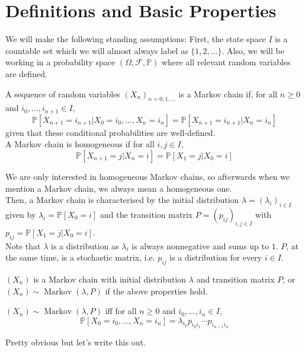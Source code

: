 \section{Definitions and Basic Properties}
We will make the following standing assumptions:
First, the state space $I$ is a countable set which we will almost always label as $\{1,2,\ldots\}$.
Also, we will be working in a probability space $(\Omega,\mathscr F,\mathbb P)$ where all relevant random variables are defined.
\begin{definition}
    A sequence of random variables $(X_n)_{n=0,1,\ldots}$ is a Markov chain if, for all $n\ge 0$ and $i_0,\ldots,i_{n+1}\in I$,
    $$\mathbb P[X_{n+1}=i_{n+1}|X_0=i_0,\ldots,X_n=i_n]=\mathbb P[X_{n+1}=i_{n+1}|X_n=i_n]$$
    given that these conditional probabilities are well-defined.\\
    A Markov chain is homogeneous if for all $i,j\in I$,
    $$\mathbb P[X_{n+1}=j|X_n=i]=\mathbb P[X_1=j|X_0=i]$$
\end{definition}
We are only interested in homogeneous Markov chains, so afterwards when we mention a Markov chain, we always mean a homogeneous one.\\
Then, a Markov chain is characterised by the initial distribution $\lambda=(\lambda_i)_{i\in I}$ given by $\lambda_i=\mathbb P[X_0=i]$ and the transition matrix $P=(p_{ij})_{i,j\in I}$ with $p_{ij}=\mathbb P[X_1=j|X_0=i]$.\\
Note that $\lambda$ is a distribution as $\lambda_i$ is always nonnegative and sums up to $1$.
$P$, at the same time, is a stochastic matrix, i.e. $p_{ij}$ is a distribution for every $i\in I$.
\begin{definition}
    $(X_n)$ is a Markov chain with initial distribution $\lambda$ and transition matrix $P$, or $(X_n)\sim\operatorname{Markov}(\lambda,P)$ if the above properties hold.
\end{definition}
\begin{theorem}\label{markov_alt_defn}
    $(X_n)\sim\operatorname{Markov}(\lambda,P)$ iff for all $n\ge 0$ and $i_0,\ldots,i_n\in I$,
    $$\mathbb P[X_0=i_0,\ldots,X_n=i_n]=\lambda_{i_0}p_{i_0i_1}\cdots p_{i_{n-1}i_n}$$
\end{theorem}
Pretty obvious but let's write this out.
